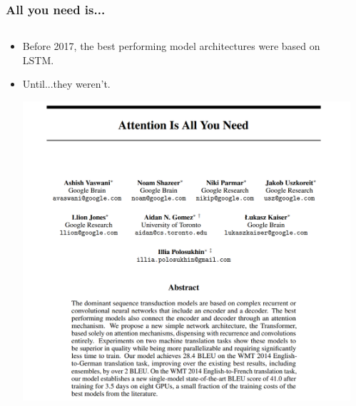 \documentclass{beamer}
\begin{document}
\begin{frame}
	\frametitle{All you need is...}
	\pause
	\begin{columns}[T] %
		\begin{column}{0.85\textwidth}
	\begin{itemize}
		\item Before 2017, the best performing model architectures were based on LSTM.
		\pause
		\item Until...they weren't.
		\pause
		\begin{center}
			\includegraphics[scale=0.13]{attention_paper}		
		\end{center}
		
	\end{itemize}

\end{column}
\begin{column}{0.15\textwidth}			
\end{column}	
\end{columns}


\end{frame}
\end{document}
